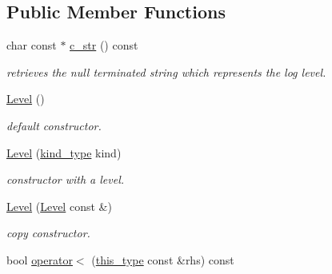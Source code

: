 \subsection*{Public Member Functions}
\begin{DoxyCompactItemize}
\item 
\hypertarget{classhryky_1_1log_1_1_level_ab1e3f9df6c97b0afcb99a9967663be6c}{char const $\ast$ \hyperlink{classhryky_1_1log_1_1_level_ab1e3f9df6c97b0afcb99a9967663be6c}{c\-\_\-str} () const }\label{classhryky_1_1log_1_1_level_ab1e3f9df6c97b0afcb99a9967663be6c}

\begin{DoxyCompactList}\small\item\em retrieves the null terminated string which represents the log level. \end{DoxyCompactList}\item 
\hypertarget{classhryky_1_1log_1_1_level_afcd6b4cf5a5c2405a5e13b0b85fe052d}{\hyperlink{classhryky_1_1log_1_1_level_afcd6b4cf5a5c2405a5e13b0b85fe052d}{Level} ()}\label{classhryky_1_1log_1_1_level_afcd6b4cf5a5c2405a5e13b0b85fe052d}

\begin{DoxyCompactList}\small\item\em default constructor. \end{DoxyCompactList}\item 
\hypertarget{classhryky_1_1log_1_1_level_aeb195484180666882126650744e6c4c4}{\hyperlink{classhryky_1_1log_1_1_level_aeb195484180666882126650744e6c4c4}{Level} (\hyperlink{classhryky_1_1log_1_1_level_a9e6bba8f272859b212f49e4478a863d7}{kind\-\_\-type} kind)}\label{classhryky_1_1log_1_1_level_aeb195484180666882126650744e6c4c4}

\begin{DoxyCompactList}\small\item\em constructor with a level. \end{DoxyCompactList}\item 
\hypertarget{classhryky_1_1log_1_1_level_a9b19e7a0a878a5493e8fdca240ccf475}{\hyperlink{classhryky_1_1log_1_1_level_a9b19e7a0a878a5493e8fdca240ccf475}{Level} (\hyperlink{classhryky_1_1log_1_1_level}{Level} const \&)}\label{classhryky_1_1log_1_1_level_a9b19e7a0a878a5493e8fdca240ccf475}

\begin{DoxyCompactList}\small\item\em copy constructor. \end{DoxyCompactList}\item 
\hypertarget{classhryky_1_1log_1_1_level_a928952372bb99d04076e8f28bad73576}{bool \hyperlink{classhryky_1_1log_1_1_level_a928952372bb99d04076e8f28bad73576}{operator$<$} (\hyperlink{classhryky_1_1log_1_1_level_a2a7ccc2d552dfdf72dc1d543e18c4780}{this\-\_\-type} const \&rhs) const }\label{classhryky_1_1log_1_1_level_a928952372bb99d04076e8f28bad73576}


\end{DoxyCompactItemize}
